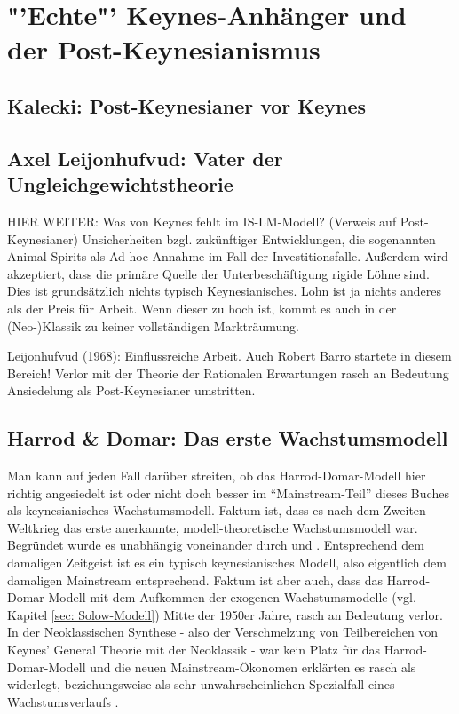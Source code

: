 %
%
%

\chapter{"'Echte"' Keynes-Anhänger und der Post-Keynesianismus}
\label{Post-Keynes}


\section{Kalecki: Post-Keynesianer vor Keynes}



\section{Axel Leijonhufvud: Vater der Ungleichgewichtstheorie}

HIER WEITER: \parencite{Patinkin1990}
Was von Keynes fehlt im IS-LM-Modell? (Verweis auf Post-Keynesianer) Unsicherheiten bzgl. zukünftiger Entwicklungen, die sogenannten Animal Spirits als Ad-hoc Annahme im Fall der Investitionsfalle. Außerdem wird akzeptiert, dass die primäre Quelle der Unterbeschäftigung rigide Löhne sind. Dies ist grundsätzlich nichts typisch Keynesianisches. Lohn ist ja nichts anderes als der Preis für Arbeit. Wenn dieser zu hoch ist, kommt es auch in der (Neo-)Klassik zu keiner vollständigen Markträumung.


Leijonhufvud (1968): Einflussreiche Arbeit. Auch Robert Barro startete in diesem Bereich!
Verlor mit der Theorie der Rationalen Erwartungen rasch an Bedeutung
Ansiedelung als Post-Keynesianer umstritten.



\section{Harrod \& Domar: Das erste Wachstumsmodell}
Man kann auf jeden Fall darüber streiten, ob das Harrod-Domar-Modell hier richtig angesiedelt ist oder nicht doch besser im "`Mainstream-Teil"' dieses Buches als keynesianisches Wachstumsmodell. Faktum ist, dass es nach dem Zweiten Weltkrieg das erste anerkannte, modell-theoretische Wachstumsmodell war. Begründet wurde es unabhängig voneinander durch \textcite{Harrod1939} und \textcite{Domar1946, Domar1947}. Entsprechend dem damaligen Zeitgeist ist es ein typisch keynesianisches Modell, also eigentlich dem damaligen Mainstream entsprechend. Faktum ist aber auch, dass das Harrod-Domar-Modell mit dem Aufkommen der exogenen Wachstumsmodelle (vgl. Kapitel \ref{sec: Solow-Modell}) Mitte der 1950er Jahre, rasch an Bedeutung verlor. In der Neoklassischen Synthese - also der Verschmelzung von Teilbereichen von Keynes' General Theorie mit der Neoklassik - war kein Platz für das Harrod-Domar-Modell und die neuen Mainstream-Ökonomen erklärten es rasch als widerlegt, beziehungsweise als sehr unwahrscheinlichen Spezialfall eines Wachstumsverlaufs \parencite{Solow1987}. 

